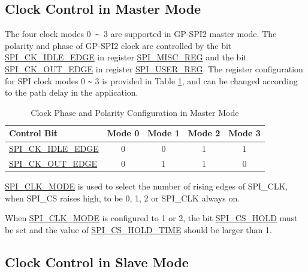 \documentclass[main\_\_EN.tex]{subfiles}
\begin{document}
\subsection{Clock Control in Master Mode}\label{sec:spi-gp-spi2-clk-ctrl-master}

The four clock modes 0\verb+ ~ +3 are supported in GP-SPI2 master mode. The polarity and phase of GP-SPI2 clock are controlled by the bit \hyperref[fielddesc:SPICKIDLEEDGE]{SPI\_CK\_IDLE\_EDGE} in register \hyperref[regdesc:SPIMISCREG]{SPI\_MISC\_REG} and the bit \hyperref[fielddesc:SPICKOUTEDGE]{SPI\_CK\_OUT\_EDGE} in register \hyperref[regdesc:SPIUSERREG]{SPI\_USER\_REG}. The register configuration for SPI clock modes 0 \verb+~+ 3 is provided in Table \ref{tab:spi-clk-phase-polarity-config-master}, and can be changed according to the path delay in the application.

\begin{table}[H]
    \centering
    \caption{Clock Phase and Polarity Configuration in Master Mode}
    \label{tab:spi-clk-phase-polarity-config-master}
    \begin{tabular}[c]{|p{3.5cm}|c|c|c|c|}
    \hline
    \rowcolor{lightgray}
    \textbf{Control Bit} & \textbf{Mode 0} & \textbf{Mode 1} & \textbf{Mode 2} & \textbf{Mode 3}\\
    \hline
    \hyperref[fielddesc:SPICKIDLEEDGE]{SPI\_CK\_IDLE\_EDGE}  & 0     & 0     & 1     & 1\\
    \hline
    \hyperref[fielddesc:SPICKOUTEDGE]{SPI\_CK\_OUT\_EDGE}   & 0     & 1     & 1     & 0\\
    \hline
    \end{tabular}
\end{table}

\hyperref[fielddesc:SPICLKMODE]{SPI\_CLK\_MODE} is used to select the number of rising edges of SPI\_CLK, when SPI\_CS raises high, to be 0, 1, 2 or SPI\_CLK always on.

\begin{tiplisting}
When \hyperref[fielddesc:SPICLKMODE]{SPI\_CLK\_MODE} is configured to 1 or 2, the bit \hyperref[fielddesc:SPICSHOLD]{SPI\_CS\_HOLD} must be set and the value of \hyperref[fielddesc:SPICSHOLDTIME]{SPI\_CS\_HOLD\_TIME} should be larger than 1.
\end{tiplisting}
\vspace{-1em}

\subsection{Clock Control in Slave Mode}\label{sec:spi-gp-spi2-clk-ctrl-slave}
\end{document}
